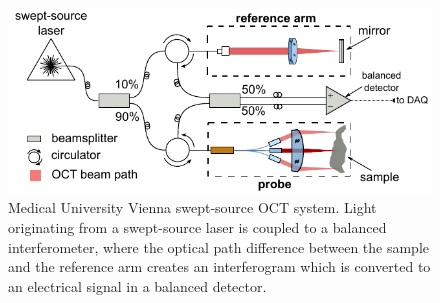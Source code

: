 \begin{figure}[h!]\centering \includegraphics[width=12cm]{figures/50_Measurements/oct/octSetupVienna.pdf}
      \caption{Medical University Vienna swept-source OCT system. Light originating from a swept-source laser is coupled to a balanced interferometer, where the optical path difference between the sample and the reference arm creates an interferogram which is converted to an electrical signal in a balanced detector.}
      \label{fig:OCTsetup}
\end{figure}

